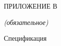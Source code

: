 \lstset{style=pythoninlinestyle}

%

 \begin{center}
	ПРИЛОЖЕНИЕ В
	
	\textit{(обязательное)}
\end{center}


\begin{center}
	Спецификация
\end{center}

